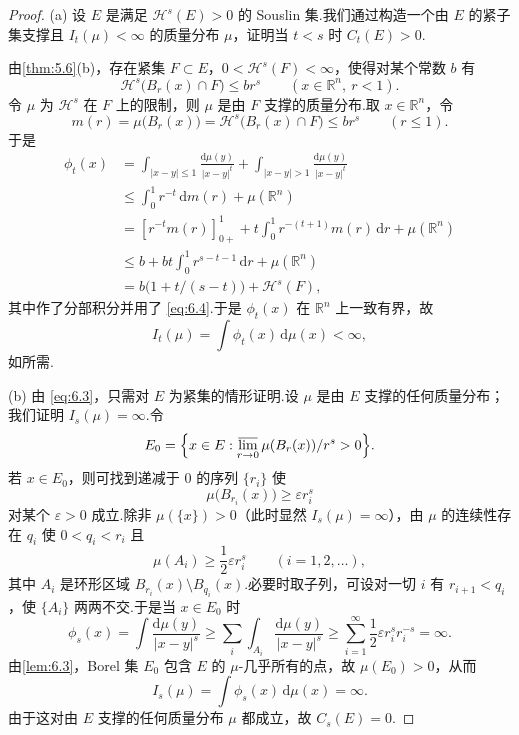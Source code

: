 \begin{proof}
(a) 设 $E$ 是满足 $\mathcal{H}^s(E)>0$ 的 Souslin 集.我们通过构造一个由 $E$ 的紧子集支撑且 $I_t(\mu)<\infty$ 的质量分布 $\mu$，证明当 $t<s$ 时 $C_t(E)>0$.

由\cref{thm:5.6}(b)，存在紧集 $F\subset E$，$0<\mathcal{H}^s(F)<\infty$，使得对某个常数 $b$ 有
\[
  \mathcal{H}^{s}\bigl(B_r(x)\cap F\bigr)\leq br^{s}\qquad(x\in\mathbb{R}^n,\ r<1).
\]
令 $\mu$ 为 $\mathcal{H}^s$ 在 $F$ 上的限制，则 $\mu$ 是由 $F$ 支撑的质量分布.取 $x\in\mathbb{R}^n$，令
\begin{equation}\label{eq:6.4}
  m(r)=\mu\bigl(B_r(x)\bigr)=\mathcal{H}^{s}\bigl(B_r(x)\cap F\bigr)\leq br^{s}\qquad(r\leq 1).
\end{equation}
于是
\[
\begin{aligned}
  \phi_t(x)
  &=\int_{|x-y|\leq 1}\frac{\mathrm{d}\mu(y)}{|x-y|^{t}}+\int_{|x-y|>1}\frac{\mathrm{d}\mu(y)}{|x-y|^{t}}\\
  &\leq\int_{0}^{1}r^{-t}\,\mathrm{d}m(r)+\mu(\mathbb{R}^n)\\
  &=[r^{-t}m(r)]_{0+}^{1}+t\int_{0}^{1}r^{-(t+1)}m(r)\,\mathrm{d}r+\mu(\mathbb{R}^n)\\
  &\leq b+bt\int_{0}^{1}r^{s-t-1}\,\mathrm{d}r+\mu(\mathbb{R}^n)\\
  &=b\bigl(1+t/(s-t)\bigr)+\mathcal{H}^{s}(F),
\end{aligned}
\]
其中作了分部积分并用了 \eqref{eq:6.4}.于是 $\phi_t(x)$ 在 $\mathbb{R}^n$ 上一致有界，故
\[
  I_t(\mu)=\int\phi_t(x)\,\mathrm{d}\mu(x)<\infty,
\]
如所需.

(b) 由 \eqref{eq:6.3}，只需对 $E$ 为紧集的情形证明.设 $\mu$ 是由 $E$ 支撑的任何质量分布；我们证明 $I_s(\mu)=\infty$.令
\[
  E_0=\Bigl\{x\in E:\varlimsup_{r\to 0}\mu(B_r(x))/r^{s}>0\Bigr\}.
\]
若 $x\in E_0$，则可找到递减于 $0$ 的序列 $\{r_i\}$ 使
\[
  \mu\bigl(B_{r_i}(x)\bigr)\geq\varepsilon r_i^{s}
\]
对某个 $\varepsilon>0$ 成立.除非 $\mu(\{x\})>0$（此时显然 $I_s(\mu)=\infty$），由 $\mu$ 的连续性存在 $q_i$ 使 $0<q_i<r_i$ 且
\[
  \mu(A_i)\geq\frac{1}{2}\varepsilon r_i^{s}\qquad(i=1,2,\ldots),
\]
其中 $A_i$ 是环形区域 $B_{r_i}(x)\setminus B_{q_i}(x)$.必要时取子列，可设对一切 $i$ 有 $r_{i+1}<q_i$，使 $\{A_i\}$ 两两不交.于是当 $x\in E_0$ 时
\[
  \phi_s(x)=\int\frac{\mathrm{d}\mu(y)}{|x-y|^{s}}
  \geq\sum_{i}\int_{A_i}\frac{\mathrm{d}\mu(y)}{|x-y|^{s}}
  \geq\sum_{i=1}^{\infty}\frac{1}{2}\varepsilon r_i^{s}r_i^{-s}=\infty.
\]
由\cref{lem:6.3}，Borel 集 $E_0$ 包含 $E$ 的 $\mu$-几乎所有的点，故 $\mu(E_0)>0$，从而
\[
  I_s(\mu)=\int\phi_s(x)\,\mathrm{d}\mu(x)=\infty.
\]
由于这对由 $E$ 支撑的任何质量分布 $\mu$ 都成立，故 $C_s(E)=0$.
\end{proof}

